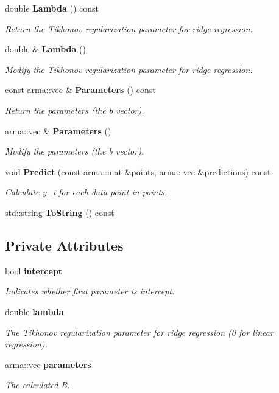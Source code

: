 \begin{DoxyCompactItemize}
double {\bf Lambda} () const 
\begin{DoxyCompactList}\small\item\em Return the Tikhonov regularization parameter for ridge regression. \end{DoxyCompactList}\item 
double \& {\bf Lambda} ()
\begin{DoxyCompactList}\small\item\em Modify the Tikhonov regularization parameter for ridge regression. \end{DoxyCompactList}\item 
const arma\-::vec \& {\bf Parameters} () const 
\begin{DoxyCompactList}\small\item\em Return the parameters (the b vector). \end{DoxyCompactList}\item 
arma\-::vec \& {\bf Parameters} ()
\begin{DoxyCompactList}\small\item\em Modify the parameters (the b vector). \end{DoxyCompactList}\item 
void {\bf Predict} (const arma\-::mat \&points, arma\-::vec \&predictions) const 
\begin{DoxyCompactList}\small\item\em Calculate y\-\_\-i for each data point in points. \end{DoxyCompactList}\item 
std\-::string {\bf To\-String} () const 
\end{DoxyCompactItemize}
\subsection*{Private Attributes}
\begin{DoxyCompactItemize}
\item 
bool {\bf intercept}
\begin{DoxyCompactList}\small\item\em Indicates whether first parameter is intercept. \end{DoxyCompactList}\item 
double {\bf lambda}
\begin{DoxyCompactList}\small\item\em The Tikhonov regularization parameter for ridge regression (0 for linear regression). \end{DoxyCompactList}\item 
arma\-::vec {\bf parameters}
\begin{DoxyCompactList}\small\item\em The calculated B. \end{DoxyCompactList}\end{DoxyCompactItemize}


